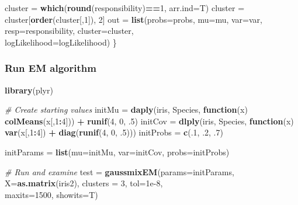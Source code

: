 \documentclass[
]{article}
\newenvironment{Shaded}{\begin{snugshade}}{\end{snugshade}}
\newcommand{\AttributeTok}[1]{\textcolor[rgb]{0.13,0.29,0.53}{#1}}
\newcommand{\CommentTok}[1]{\textcolor[rgb]{0.56,0.35,0.01}{\textit{#1}}}
\newcommand{\ControlFlowTok}[1]{\textcolor[rgb]{0.13,0.29,0.53}{\textbf{#1}}}
\newcommand{\DecValTok}[1]{\textcolor[rgb]{0.00,0.00,0.81}{#1}}
\newcommand{\FloatTok}[1]{\textcolor[rgb]{0.00,0.00,0.81}{#1}}
\newcommand{\FunctionTok}[1]{\textcolor[rgb]{0.13,0.29,0.53}{\textbf{#1}}}
\newcommand{\NormalTok}[1]{#1}
\newcommand{\OtherTok}[1]{\textcolor[rgb]{0.56,0.35,0.01}{#1}}
\newcommand{\SpecialCharTok}[1]{\textcolor[rgb]{0.81,0.36,0.00}{\textbf{#1}}}
\newcommand{\StringTok}[1]{\textcolor[rgb]{0.31,0.60,0.02}{#1}}
\begin{document}
\begin{Shaded}
\begin{Highlighting}[]
\NormalTok{  cluster }\OtherTok{=} \FunctionTok{which}\NormalTok{(}\FunctionTok{round}\NormalTok{(responsibility)}\SpecialCharTok{==}\DecValTok{1}\NormalTok{, }\AttributeTok{arr.ind=}\NormalTok{T)}
\NormalTok{  cluster }\OtherTok{=}\NormalTok{ cluster[}\FunctionTok{order}\NormalTok{(cluster[,}\DecValTok{1}\NormalTok{]), }\DecValTok{2}\NormalTok{]}
\NormalTok{  out }\OtherTok{=} \FunctionTok{list}\NormalTok{(}\AttributeTok{probs=}\NormalTok{probs, }\AttributeTok{mu=}\NormalTok{mu, }\AttributeTok{var=}\NormalTok{var, }\AttributeTok{resp=}\NormalTok{responsibility, }\AttributeTok{cluster=}\NormalTok{cluster, }\\
\AttributeTok{logLikelihood=}\NormalTok{logLikelihood)}
\NormalTok{\} }
\end{Highlighting}
\end{Shaded}

\subsubsection{Run EM algorithm}\label{run-em-algorithm}

\begin{Shaded}
\begin{Highlighting}[]
\FunctionTok{library}\NormalTok{(plyr)}

\CommentTok{\# Create starting values}
\NormalTok{initMu }\OtherTok{=} \FunctionTok{daply}\NormalTok{(iris, }\StringTok{\textquotesingle{}Species\textquotesingle{}}\NormalTok{, }\ControlFlowTok{function}\NormalTok{(x) }\FunctionTok{colMeans}\NormalTok{(x[,}\DecValTok{1}\SpecialCharTok{:}\DecValTok{4}\NormalTok{])) }\SpecialCharTok{+} \FunctionTok{runif}\NormalTok{(}\DecValTok{4}\NormalTok{, }\DecValTok{0}\NormalTok{, .}\DecValTok{5}\NormalTok{)}
\NormalTok{initCov }\OtherTok{=} \FunctionTok{dlply}\NormalTok{(iris, }\StringTok{\textquotesingle{}Species\textquotesingle{}}\NormalTok{, }\ControlFlowTok{function}\NormalTok{(x) }\FunctionTok{var}\NormalTok{(x[,}\DecValTok{1}\SpecialCharTok{:}\DecValTok{4}\NormalTok{]) }\SpecialCharTok{+} \FunctionTok{diag}\NormalTok{(}\FunctionTok{runif}\NormalTok{(}\DecValTok{4}\NormalTok{, }\DecValTok{0}\NormalTok{, .}\DecValTok{5}\NormalTok{)))}
\NormalTok{initProbs }\OtherTok{=} \FunctionTok{c}\NormalTok{(.}\DecValTok{1}\NormalTok{, .}\DecValTok{2}\NormalTok{, .}\DecValTok{7}\NormalTok{)}

\NormalTok{initParams }\OtherTok{=} \FunctionTok{list}\NormalTok{(}\AttributeTok{mu=}\NormalTok{initMu, }\AttributeTok{var=}\NormalTok{initCov, }\AttributeTok{probs=}\NormalTok{initProbs)  }

\CommentTok{\# Run and examine}
\NormalTok{test }\OtherTok{=} \FunctionTok{gaussmixEM}\NormalTok{(}\AttributeTok{params=}\NormalTok{initParams, }\AttributeTok{X=}\FunctionTok{as.matrix}\NormalTok{(iris2), }\AttributeTok{clusters =} \DecValTok{3}\NormalTok{, }\AttributeTok{tol=}\FloatTok{1e{-}8}\NormalTok{, }\\
\AttributeTok{maxits=}\DecValTok{1500}\NormalTok{, }\AttributeTok{showits=}\NormalTok{T)}
\end{Highlighting}
\end{Shaded}
\end{document}
